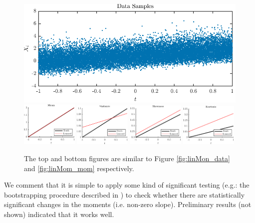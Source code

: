 \documentclass[11pt,letterpaper]{article}
\begin{document}
\begin{figure}
    \centering
    \includegraphics{figs/linMom_data2}
    \includegraphics[width = 0.24\textwidth]{figs/linMom_mean2}
    \includegraphics[width = 0.24\textwidth]{figs/linMom_var2}
    \includegraphics[width = 0.24\textwidth]{figs/linMom_skew2}
    \includegraphics[width = 0.24\textwidth]{figs/linMom_kurt2}
    \caption{The top and bottom figures are similar to Figure \ref{fig:linMon_data} and \ref{fig:linMom_mom} respectively.}
    \label{fig:linMom_mom2}
\end{figure}

We comment that it is simple to apply some kind of significant testing (e.g.: the bootstrapping procedure described in \cite{FalascaEtAl_22}) to check whether there are statistically significant changes in the moments (i.e. non-zero slope). Preliminary results (not shown) indicated that it works well.
\end{document}
